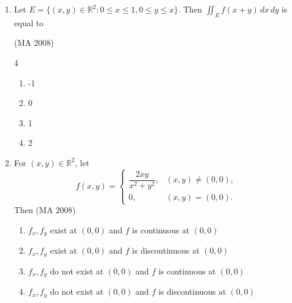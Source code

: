 \begin{enumerate}[label=\thesubsection.\arabic*,ref=\thesubsection.\theenumi]
\item Let \(E = \{(x, y) \in \mathbb{R}^2: 0 \leq x \leq 1, 0 \leq y \leq x\}\). Then \(\displaystyle \iint_{E} f(x + y) \, dx\, dy\) is equal to

\hfill (MA 2008)
\begin{multicols}{4}
\begin{enumerate}
\item -1
\item 0
\item 1
\item 2
\end{enumerate}
\end{multicols}
\item For \((x,y) \in \mathbb{R}^2\), let
\[
f(x,y) = \begin{cases}
\dfrac{2xy}{x^2 + y^2}, & (x,y) \neq (0,0), \\
0, & (x,y) = (0,0).
\end{cases}
\]
Then
\hfill (MA 2008)
\begin{enumerate}
\item \(f_x, f_y\) exist at \((0,0)\) and \(f\) is continuous at \((0,0)\)
\item \(f_x, f_y\) exist at \((0,0)\) and \(f\) is discontinuous at \((0,0)\)
\item \(f_x, f_y\) do not exist at \((0,0)\) and \(f\) is continuous at \((0,0)\)
\item \(f_x, f_y\) do not exist at \((0,0)\) and \(f\) is discontinuous at \((0,0)\)
\end{enumerate}
\end{enumerate}

